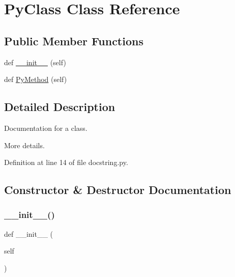 \hypertarget{classdocstring_1_1_py_class}{}\section{Py\+Class Class Reference}
\label{classdocstring_1_1_py_class}
\subsection*{Public Member Functions}
\begin{DoxyCompactItemize}
\item 
def \hyperlink{classdocstring_1_1_py_class_ae64f0875afe3067b97ba370b354b9213}{\+\_\+\+\_\+init\+\_\+\+\_\+} (self)
\item 
def \hyperlink{classdocstring_1_1_py_class_a06331a3bf023b9e7a180422e737b0381}{Py\+Method} (self)
\end{DoxyCompactItemize}


\subsection{Detailed Description}
\begin{DoxyVerb}Documentation for a class.

More details.
\end{DoxyVerb}
 

Definition at line 14 of file docstring.\+py.



\subsection{Constructor \& Destructor Documentation}
\mbox{\label{classdocstring_1_1_py_class_ae64f0875afe3067b97ba370b354b9213}} 
\subsubsection{\texorpdfstring{\+\_\+\+\_\+init\+\_\+\+\_\+()}{\_\_init\_\_()}}
{\footnotesize\ttfamily def \+\_\+\+\_\+init\+\_\+\+\_\+ (\begin{DoxyParamCaption}\item[{}]{self }\end{DoxyParamCaption})}

